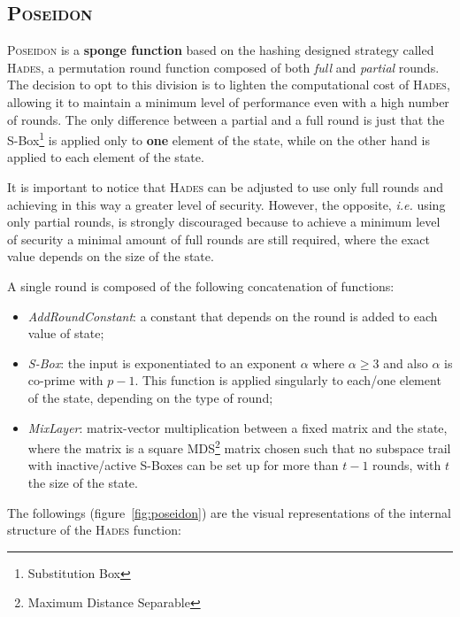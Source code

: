 \documentclass[12pt, a4paper]{report}
\begin{document}
\subsection{\textsc{Poseidon}}\label{subsec:poseidon}

\textsc{Poseidon} is a \textbf{sponge function} based on the hashing designed strategy called \textsc{Hades}, a permutation round function composed of both \textit{full} and \textit{partial} rounds.
The decision to opt to this division is to lighten the computational cost of \textsc{Hades}, allowing it to maintain a minimum level of performance even with a high number of rounds. The only difference between a partial and a full round is just that the S-Box\footnote{Substitution Box} is applied only to \textbf{one} element of the state, while on the other hand is applied to each element of the state.

\begin{note}
It is important to notice that \textsc{Hades} can be adjusted to use only full rounds and achieving in this way a greater level of security.
However, the opposite, \textsl{i.e.} using only partial rounds, is strongly discouraged because to achieve a minimum level of security a minimal amount of full rounds are still required, where the exact value depends on the size of the state.
\end{note}

A single round is composed of the following concatenation of functions:
\begin{itemize}
  \item \textit{AddRoundConstant}: a constant that depends on the round is added to each value of state;
  \item \textit{S-Box}: the input is exponentiated to an exponent $\alpha$ where $\alpha \ge 3$ and also $\alpha$ is co-prime with $p-1$. This function is applied singularly to each/one element of the state, depending on the type of round;
  \item \textit{MixLayer}: matrix-vector multiplication between a fixed matrix and the state, where the matrix is a square MDS\footnote{Maximum Distance Separable} matrix chosen such that no subspace trail with inactive/active S-Boxes can be set up for more than $t-1$ rounds, with $t$ the size of the state.
\end{itemize}

The followings (figure~\ref{fig:poseidon}) are the visual representations of the internal structure of the \textsc{Hades} function:
\end{document}
